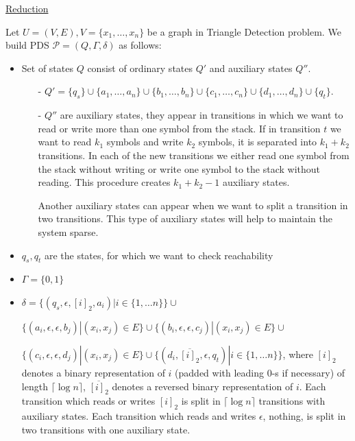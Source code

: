 \documentclass[12pt]{article}
\begin{document}
\underline{Reduction} 

Let $U = (V, E), V = \{x_1, \ldots, x_n\}$ be a graph in Triangle Detection problem. We build PDS $\mathcal{P} = (Q, \Gamma, \delta)$ as follows:

\begin{itemize}
    \item Set of states $Q$ consist of ordinary states $Q'$ and auxiliary states $Q''$. 
    
    \begin{itemize}
        \item[-] $Q' = \{q_s\} \cup \{a_1, \ldots, a_n\} \cup \{b_1, \ldots, b_n\} \cup \{c_1, \ldots, c_n\} \cup \{d_1, \ldots, d_n\} \cup \{q_t\}$.
        \item[-]$Q''$ are auxiliary states, they appear in transitions in which we want to read or write more than one symbol from the stack. If in transition $t$ we want to read $k_1$ symbols and write $k_2$ symbols, it is separated into $k_1 + k_2$ transitions. In each of the new transitions we either read one symbol from the stack without writing or write one symbol to the stack without reading. This procedure creates $k_1 + k_2 - 1$ auxiliary states. 
        
        Another auxiliary states can appear when we want to split a transition in two transitions. This type of auxiliary states will help to maintain the system sparse.
    \end{itemize}
     
    \item $q_s, q_t$ are the states, for which we want to check reachability 
    \item $\Gamma = \{0, 1\}$
    \item $\delta = 
    \{(q_s, \epsilon, [i]_2, a_i)|i \in \{1, \ldots n\}\} \cup$ 
    
    $\{(a_i, \epsilon, \epsilon, b_j)|(x_i, x_j) \in E\} \cup
    \{(b_i, \epsilon, \epsilon, c_j)|(x_i, x_j) \in E\} \cup$
    
    $\{(c_i, \epsilon, \epsilon, d_j)|(x_i, x_j) \in E\} \cup
    \{(d_i, \overline{[i]_2}, \epsilon, q_t)|i \in \{1, \ldots n\}\}$, where $[i]_2$ denotes a binary representation of $i$ (padded with leading 0-s if necessary) of length $\lceil \log n \rceil$, $\overline{[i]_2}$ denotes a reversed binary representation of $i$. Each transition which reads or writes $[i]_2$ is split in $\lceil \log n \rceil$ transitions with auxiliary states. Each transition which reads and writes $\epsilon$, nothing, is split in two transitions with one auxiliary state. 
\end{itemize}
\end{document}
